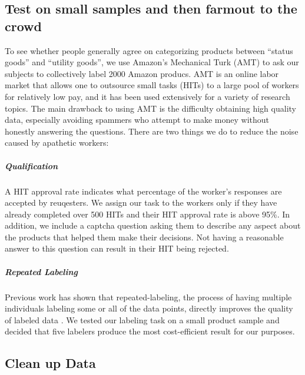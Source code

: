 \documentclass[dvips,12pt]{article}
\begin{document}
\subsection{Test on small samples and then farmout to the crowd}
To see whether people generally agree on categorizing products between “status goods” and “utility goods”, we use Amazon’s Mechanical Turk (AMT) to ask our subjects to
collectively label 2000 Amazon producs. AMT is an online labor market that allows one to outsource small tasks (HITs) to a large pool of workers for relatively low pay, and it has been used extensively for a variety of research topics. The main drawback to using AMT is the difficulty obtaining high quality data, especially avoiding spammers who attempt to make money without honestly answering the questions. There are two things we do to reduce the noise caused by apathetic workers:

\subparagraph{Qualification}
A HIT approval rate indicates what percentage of the worker’s responses are accepted by reuqesters. We assign our task to the workers only if they have already completed over 500 HITs and their HIT approval rate is above 95\%. In addition, we include a captcha question asking them to describe any aspect about the products that helped them make their decisions. Not having a reasonable answer to this question can result in their HIT being rejected.

\subparagraph{Repeated Labeling}
Previous work has shown that repeated-labeling, the process of having multiple individuals labeling some or all of the data points, directly improves the quality of labeled data \cite{sheng2008ge}. We tested our labeling task on a small product sample and decided that five labelers produce the most cost-efficient result for our purposes.

\subsection{Clean up Data}
\end{document}
